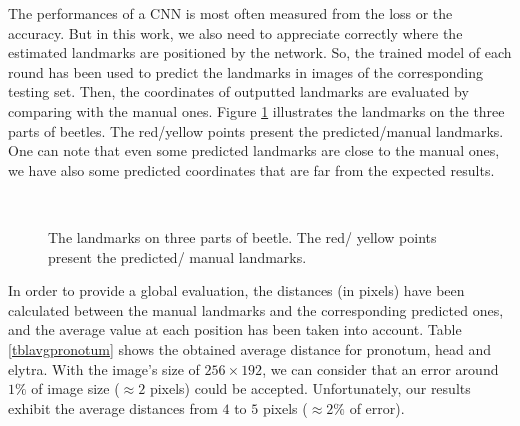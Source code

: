 \documentclass[review]{elsarticle}
\begin{document}
The performances of a CNN is most often measured from the loss or the accuracy. But in this work, we also need to appreciate correctly where the estimated landmarks are positioned by the network. So, the trained model of each round has been used to predict the landmarks in images of the corresponding testing set. Then, the coordinates of outputted landmarks are evaluated by comparing with the manual ones. Figure \ref{figeb1} illustrates the landmarks on the three parts of beetles. The red/yellow points present the predicted/manual landmarks. One can note that even some predicted landmarks are close to the manual ones, we have also some predicted coordinates that are far from the expected results.

\begin{figure}[h!]
	\centering
    ~~
	~~
    \caption{The landmarks on three parts of beetle. The red/ yellow points present the predicted/ manual landmarks.}
    \label{figeb1}
\end{figure}

In order to provide a global evaluation, the distances (in pixels) have been calculated between the manual landmarks and the corresponding predicted ones, and the average value at each position has been taken into account. Table \ref{tblavgpronotum} shows the obtained average distance for pronotum, head and elytra. With the image's size of $256 \times 192$, we can consider that an error around $1\%$ of image size ($\approx 2$ pixels) could be accepted. Unfortunately, our results exhibit the average distances from $4$ to $5$ pixels ($\approx 2\%$ of error).
\end{document}
